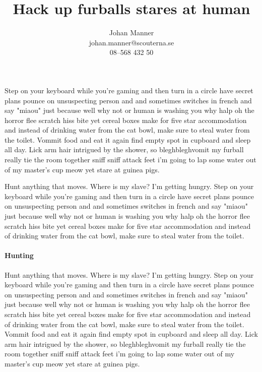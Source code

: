 \documentclass[12pt,a4paper]{article}
\begin{document}
	\title{Hack up furballs stares at human}
	\author{Johan Manner\\
			johan.manner@scouterna.se\\
			08--568 432 50
	}
	\maketitle%
	
	Step on your keyboard while you're gaming and then turn in a circle 
	have secret plans pounce on unsuspecting person and and sometimes switches 
	in french and say "miaou" just because well why not or human is washing you 
	why halp oh the horror flee scratch hiss bite yet cereal boxes make for 
	five star accommodation and instead of drinking water from the cat bowl, 
	make sure to steal water from the toilet. Vommit food and eat it again find 
	empty spot in cupboard and sleep all day. Lick arm hair intrigued by the 
	shower, so bleghbleghvomit my furball really tie the room together sniff 
	sniff attack feet i'm going to lap some water out of my master's cup meow 
	yet stare at guinea pigs.
	
	Hunt anything that moves. Where is my slave? I'm getting hungry. Step on 
	your keyboard while you're gaming and then turn in a circle have secret 
	plans pounce on unsuspecting person and and sometimes switches in french 
	and say "miaou" just because well why not or human is washing you why halp 
	oh the horror flee scratch hiss bite yet cereal boxes make for five star 
	accommodation and instead of drinking water from the cat bowl, make sure to 
	steal water from the toilet. 
	
	\paragraph*{Hunting}Hunt anything that moves. Where is my slave? I'm 
	getting hungry. Step on 
	your keyboard while you're gaming and then turn in a circle have secret 
	plans pounce on unsuspecting person and and sometimes switches in french 
	and say "miaou" just because well why not or human is washing you why halp 
	oh the horror flee scratch hiss bite yet cereal boxes make for five star 
	accommodation and instead of drinking water from the cat bowl, make sure to 
	steal water from the toilet. Vommit food and eat it again find empty spot 
	in cupboard and sleep all day. Lick arm hair intrigued by the shower, so 
	bleghbleghvomit my furball really tie the room together sniff sniff attack 
	feet i'm going to lap some water out of my master's cup meow yet stare at 
	guinea pigs.
	
\end{document}

